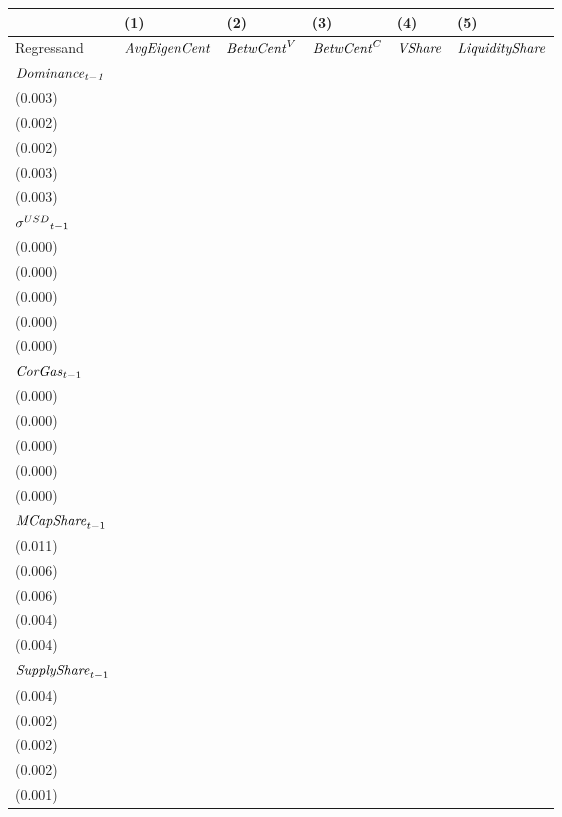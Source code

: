 \begin{tabular}{llllll}
\toprule
{} &                                  (1) &                                  (2) &                                   (3) &                                  (4) &                                   (5) \\
\midrule
Regressand                   &                 ${\it AvgEigenCent}$ &                   ${\it BetwCent}^V$ &                    ${\it BetwCent}^C$ &                       ${\it VShare}$ &                ${\it LiquidityShare}$ \\
$\it Dominance_{t-1}$        &  \makecell{$0.699^{***}$ \\ (0.003)} &  \makecell{$0.936^{***}$ \\ (0.002)} &   \makecell{$0.903^{***}$ \\ (0.002)} &  \makecell{$0.803^{***}$ \\ (0.003)} &   \makecell{$0.774^{***}$ \\ (0.003)} \\
${{\it \sigma}^{USD}}_{t-1}$ &    \makecell{$-0.000^{}$ \\ (0.000)} &     \makecell{$0.000^{}$ \\ (0.000)} &      \makecell{$0.000^{}$ \\ (0.000)} &    \makecell{$-0.000^{}$ \\ (0.000)} &     \makecell{$-0.000^{}$ \\ (0.000)} \\
${{\it CorGas}}_{t-1}$       &   \makecell{$-0.001^{*}$ \\ (0.000)} &    \makecell{$-0.000^{}$ \\ (0.000)} &     \makecell{$-0.000^{}$ \\ (0.000)} &    \makecell{$-0.000^{}$ \\ (0.000)} &      \makecell{$0.000^{}$ \\ (0.000)} \\
${{\it MCapShare}}_{t-1}$    &    \makecell{$-0.006^{}$ \\ (0.011)} &  \makecell{$0.066^{***}$ \\ (0.006)} &   \makecell{$0.089^{***}$ \\ (0.006)} &  \makecell{$0.063^{***}$ \\ (0.004)} &   \makecell{$0.141^{***}$ \\ (0.004)} \\
${{\it SupplyShare}}_{t-1}$  &  \makecell{$0.066^{***}$ \\ (0.004)} &     \makecell{$0.000^{}$ \\ (0.002)} &     \makecell{$-0.003^{}$ \\ (0.002)} &  \makecell{$0.019^{***}$ \\ (0.002)} &  \makecell{$-0.005^{***}$ \\ (0.001)} \\

\end{tabular}
